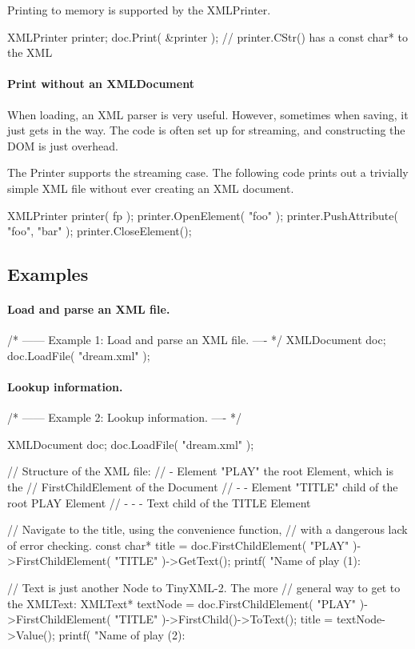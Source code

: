 Printing to memory is supported by the X\+M\+L\+Printer. \begin{DoxyVerb}XMLPrinter printer;
doc.Print( &printer );
// printer.CStr() has a const char* to the XML
\end{DoxyVerb}


\paragraph*{Print without an X\+M\+L\+Document}

When loading, an X\+M\+L parser is very useful. However, sometimes when saving, it just gets in the way. The code is often set up for streaming, and constructing the D\+O\+M is just overhead.

The Printer supports the streaming case. The following code prints out a trivially simple X\+M\+L file without ever creating an X\+M\+L document. \begin{DoxyVerb}XMLPrinter printer( fp );
printer.OpenElement( "foo" );
printer.PushAttribute( "foo", "bar" );
printer.CloseElement();
\end{DoxyVerb}


\subsection*{Examples }

\paragraph*{Load and parse an X\+M\+L file.}

\begin{DoxyVerb}/* ------ Example 1: Load and parse an XML file. ---- */    
{
    XMLDocument doc;
    doc.LoadFile( "dream.xml" );
}
\end{DoxyVerb}


\paragraph*{Lookup information.}

\begin{DoxyVerb}/* ------ Example 2: Lookup information. ---- */    
{
    XMLDocument doc;
    doc.LoadFile( "dream.xml" );

    // Structure of the XML file:
    // - Element "PLAY"      the root Element, which is the 
    //                       FirstChildElement of the Document
    // - - Element "TITLE"   child of the root PLAY Element
    // - - - Text            child of the TITLE Element

    // Navigate to the title, using the convenience function,
    // with a dangerous lack of error checking.
    const char* title = doc.FirstChildElement( "PLAY" )->FirstChildElement( "TITLE" )->GetText();
    printf( "Name of play (1): %

    // Text is just another Node to TinyXML-2. The more
    // general way to get to the XMLText:
    XMLText* textNode = doc.FirstChildElement( "PLAY" )->FirstChildElement( "TITLE" )->FirstChild()->ToText();
    title = textNode->Value();
    printf( "Name of play (2): %
}
\end{DoxyVerb}


